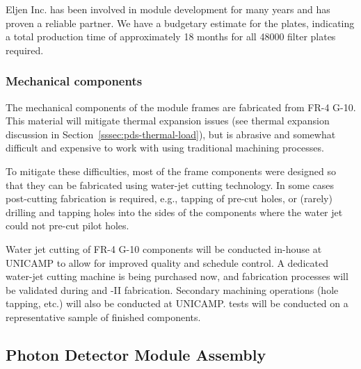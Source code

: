 
Eljen Inc. has been involved in  module development for many years and has proven a reliable partner.  We have a budgetary estimate for the plates, indicating a total production time of approximately \num{18} months for all \num{48000} filter plates required.

\subsubsection{Mechanical components}

The mechanical components of the  module frames are fabricated from
FR-4 G-10. This material will mitigate thermal expansion issues (see thermal expansion discussion in Section~\ref{sssec:pds-thermal-load}),
but is abrasive and somewhat difficult and expensive to work with using traditional machining processes.

To mitigate these difficulties, most of the  frame components were designed so that they can be fabricated using water-jet cutting technology.  In some cases post-cutting fabrication is required, e.g., tapping of pre-cut holes, or (rarely) drilling and tapping holes into the sides of the components where the water jet could not pre-cut pilot holes.

Water jet cutting of FR-4 G-10 components will be conducted in-house at UNICAMP to allow for improved quality and schedule control.  A dedicated water-jet cutting machine is being purchased now, and fabrication processes will be validated during  and -II fabrication.  Secondary machining operations (hole tapping, etc.) will also be conducted at UNICAMP.   tests will be conducted on a representative sample of finished components.

\label{sec:fdsp-pd-prod-pc}



\subsection{Photon Detector Module Assembly}

